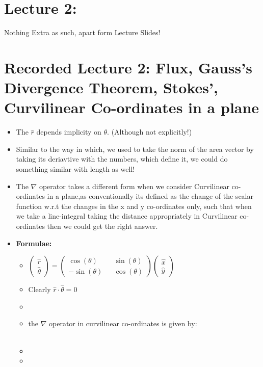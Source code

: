 \documentclass{article}
\begin{document}
\section{Lecture 2: }
Nothing Extra as such, apart form Lecture Slides!

\section{Recorded Lecture 2: Flux, Gauss's Divergence Theorem, Stokes', Curvilinear Co-ordinates in a plane}
\begin{itemize}
  \item The $\hat{r}$ depends implicity on $\theta$. (Although not explicitly!)
  \item Similar to the way in which, we used to take the norm of the area vector by taking its deriavtive with the numbers, which
  define it, we could do something similar with length as well!
  \item The $\nabla$ operator takes a different form when we consider Curvilinear co-ordinates in a plane,as conventionally its defined as the change of the scalar function w.r.t the changes in the x and y co-ordinates only, such that when we take a line-integral taking the distance appropriately in Curvilinear co-ordinates then we could get the right answer.
  \item \textbf{Formulae:}
  \begin{itemize}
    \item $\begin{pmatrix}
              \hat{r} \\
              \hat{\theta}
          \end{pmatrix} =
          \begin{pmatrix}
            \cos (\theta) && \sin (\theta) \\
            -\sin (\theta) && \cos (\theta)
          \end{pmatrix}
          \begin{pmatrix}
            \hat{x} \\ \hat{y}
          \end{pmatrix}$
          \item Clearly $ \hat{r} \cdot \hat{\theta} = 0$
          \item {}
          \item the $ \nabla$ operator in curvilinear co-ordinates is given by: \\ \\
          \item {}
          \item {}
  \end{itemize}
\end{itemize}
\end{document}
